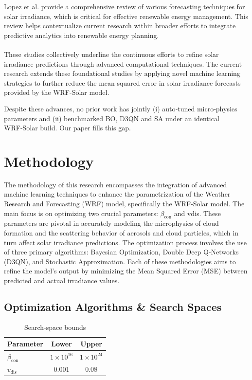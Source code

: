 \documentclass[conference]{IEEEtran}
\begin{document}
Lopez et al. provide a comprehensive review of various forecasting techniques for solar irradiance, which is critical for effective renewable energy management. This review helps contextualize current research within broader efforts to integrate predictive analytics into renewable energy planning.
\\
\\
These studies collectively underline the continuous efforts to refine solar irradiance predictions through advanced computational techniques. The current research extends these foundational studies by applying novel machine learning strategies to further reduce the mean squared error in solar irradiance forecasts provided by the WRF-Solar model.

Despite these advances, no prior work has jointly (i) auto‑tuned micro‑physics parameters and (ii) benchmarked BO, D3QN and SA under an identical WRF‑Solar build. Our paper fills this gap.

\section{Methodology}
The methodology of this research encompasses the integration of advanced machine learning techniques to enhance the parametrization of the Weather Research and Forecasting (WRF) model, specifically the WRF-Solar model. The main focus is on optimizing two crucial parameters: \(\beta_{\text{con}}\) and vdis. These parameters are pivotal in accurately modeling the microphysics of cloud formation and the scattering behavior of aerosols and cloud particles, which in turn affect solar irradiance predictions. The optimization process involves the use of three primary algorithms: Bayesian Optimization, Double Deep Q-Networks (D3QN), and Stochastic Approximation. Each of these methodologies aims to refine the model’s output by minimizing the Mean Squared Error (MSE) between predicted and actual irradiance values.

\subsection{Optimization Algorithms \& Search Spaces}

\begin{table}[h]
  \centering
  \caption{Search‑space bounds}
  \begin{tabular}{lcc}
    \toprule
    Parameter & Lower & Upper\\
    \midrule
    $\beta_{\mathrm{con}}$ & $1\times10^{16}$ & $1\times10^{24}$\\
    $v_{\mathrm{dis}}$     & 0.001            & 0.08\\
    \bottomrule
  \end{tabular}
\end{table}
\end{document}
